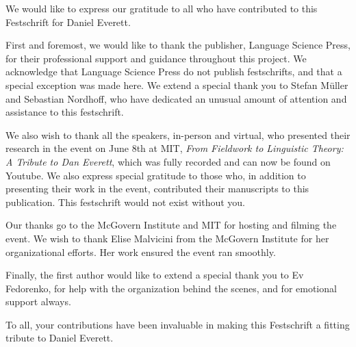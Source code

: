 \addchap{\lsAcknowledgementTitle} 

We would like to express our gratitude to all who have contributed to this Festschrift for Daniel Everett. 

First and foremost, we would like to thank the publisher, Language Science Press, for their professional support and guidance throughout this project. We acknowledge that Language Science Press do not publish festschrifts, and that a special exception was made here. We extend a special thank you to Stefan Müller and Sebastian Nordhoff, who have dedicated an unusual amount of attention and assistance to this festschrift. 

We also wish to thank all the speakers, in-person and virtual, who presented their research in the event on June 8th at MIT, \textit{From Fieldwork to Linguistic Theory: A Tribute to Dan Everett}, which was fully recorded and can now be found on Youtube. We also express special gratitude to those who, in addition to presenting their work in the event, contributed their manuscripts to this publication. This festschrift would not exist without you. 

Our thanks go to the McGovern Institute and MIT for hosting and filming the event. We wish to thank Elise Malvicini from the McGovern Institute for her organizational efforts. Her work ensured the event ran smoothly. 

Finally, the first author would like to extend a special thank you to Ev Fedorenko, for help with the organization behind the scenes, and for emotional support always.

To all, your contributions have been invaluable in making this Festschrift a fitting tribute to Daniel Everett.
